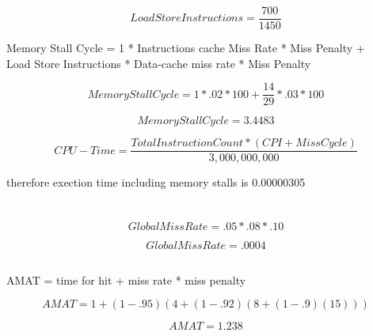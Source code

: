 \documentclass{article}
\begin{document}
\begin{equation*}
  Load Store Instructions = \frac{700}{1450}
\end{equation*}

Memory Stall Cycle = 1 * Instructions cache Miss Rate * Miss Penalty + \\Load Store Instructions * Data-cache miss rate * Miss Penalty

\begin{equation*}
  Memory Stall Cycle = 1 *.02 * 100 + \frac{14}{29} *.03 * 100
\end{equation*}

\begin{equation*}
  Memory Stall Cycle = 3.4483
\end{equation*}

\begin{equation*}
  CPU-Time = \frac{Total Instruction Count * (CPI + Miss Cycle)}{3,000,000,000}
\end{equation*}

therefore exection time including memory stalls is 0.00000305

\section{}

\subsection{}

\begin{equation*}
  Global Miss Rate =.05*.08*.10
\end{equation*}

\begin{equation*}
  Global Miss Rate =.0004
\end{equation*}

\subsection{}

AMAT = time for hit + miss rate * miss penalty

\begin{equation*}
  AMAT = 1+(1-.95)(4+(1-.92)(8+(1-.9)(15)))
\end{equation*}

\begin{equation*}
  AMAT = 1.238
\end{equation*}
\end{document}
